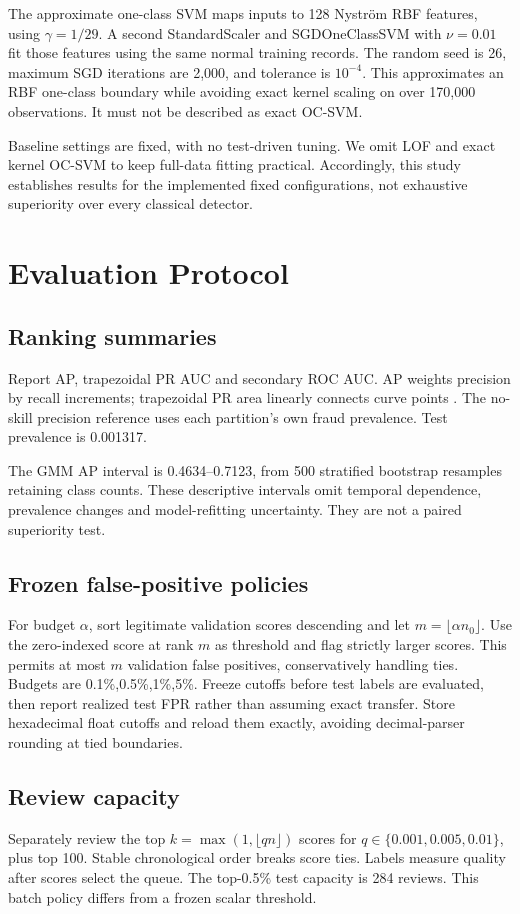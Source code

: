 \documentclass[conference]{IEEEtran}
\begin{document}
The approximate one-class SVM maps inputs to 128 Nystr\"om RBF features, using $\gamma=1/29$. A second StandardScaler and SGDOneClassSVM with $\nu=0.01$ fit those features using the same normal training records. The random seed is 26, maximum SGD iterations are 2,000, and tolerance is $10^{-4}$. This approximates an RBF one-class boundary while avoiding exact kernel scaling on over 170,000 observations. It must not be described as exact OC-SVM.

Baseline settings are fixed, with no test-driven tuning. We omit LOF and exact kernel OC-SVM to keep full-data fitting practical. Accordingly, this study establishes results for the implemented fixed configurations, not exhaustive superiority over every classical detector.

\section{Evaluation Protocol}
\subsection{Ranking summaries}
Report AP, trapezoidal PR AUC and secondary ROC AUC. AP weights precision by recall increments; trapezoidal PR area linearly connects curve points \cite{ap}. The no-skill precision reference uses each partition's own fraud prevalence. Test prevalence is 0.001317.

The GMM AP interval is 0.4634--0.7123, from 500 stratified bootstrap resamples retaining class counts. These descriptive intervals omit temporal dependence, prevalence changes and model-refitting uncertainty. They are not a paired superiority test.

\subsection{Frozen false-positive policies}
For budget $\alpha$, sort legitimate validation scores descending and let $m=\lfloor\alpha n_0\rfloor$. Use the zero-indexed score at rank $m$ as threshold and flag strictly larger scores. This permits at most $m$ validation false positives, conservatively handling ties. Budgets are 0.1\%,0.5\%,1\%,5\%. Freeze cutoffs before test labels are evaluated, then report realized test FPR rather than assuming exact transfer. Store hexadecimal float cutoffs and reload them exactly, avoiding decimal-parser rounding at tied boundaries.

\subsection{Review capacity}
Separately review the top $k=\max(1,\lfloor qn\rfloor)$ scores for $q\in\{0.001,0.005,0.01\}$, plus top 100. Stable chronological order breaks score ties. Labels measure quality after scores select the queue. The top-0.5\% test capacity is 284 reviews. This batch policy differs from a frozen scalar threshold.
\end{document}
